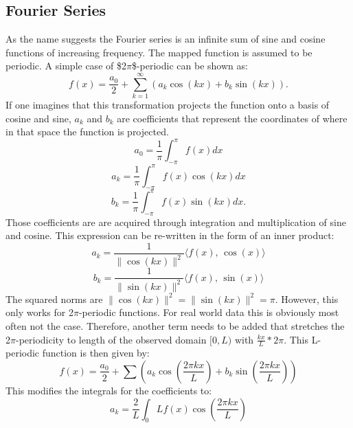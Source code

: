 \documentclass[phd,black, hidelinks]{PrincetonThesis}
\begin{document}
\subsection{Fourier Series}
\label{sec:org4fe6529}
As the name suggests the Fourier series is an infinite sum of sine and cosine functions of increasing frequency. The mapped function is assumed to be periodic. A simple case of \$2\(\pi\)\$-periodic can be shown as:
\begin{equation}
f(x) = \frac{a_0}{2} + \sum_{k=1}^\infty (a_k \cos(kx) + b_k\sin(kx)).
\end{equation}
If one imagines that this transformation projects the function onto a basis of cosine and sine, \(a_k\) and \(b_k\) are coefficients that represent the coordinates of where in that space the function is projected.
\begin{equation}
a_0 = \frac{1}{\pi} \int_{-\pi}^{\pi} f(x)dx
\end{equation}
\begin{equation}
a_k=\frac{1}{\pi} \int_{-\pi}^{\pi} f(x) \cos(kx)dx
\end{equation}
\begin{equation}
b_k=\frac{1}{\pi} \int_{-\pi}^{\pi} f(x) \sin(kx)dx.
\end{equation}
Those coefficients are are acquired through integration and multiplication of sine and cosine.
This expression can be re-written in the form of an inner product:
\begin{equation}
a_k = \frac{1}{\|\cos(kx)\|^2} \langle f(x),\, \cos(x)\rangle
\end{equation}
\begin{equation}
b_k = \frac{1}{\|\sin(kx)\|^2} \langle f(x),\, \sin(x)\rangle
\end{equation}
The squared norms are \(\|\cos(kx)\|^2 = \|\sin(kx)\|^2 = \pi\). However, this only works for 2\(\pi\)-periodic functions. For real world data this is obviously most often not the case. Therefore, another term needs to be added that stretches the 2\(\pi\)-periodicity to length of the observed domain \([0,L)\) with \(\frac{kx}{L}*2\pi\). This L-periodic function is then given by:
\begin{equation}
f(x) = \frac{a_0}{2} + \sum \left( a_k\cos \left( \frac{2\pi kx}{L} \right) + b_k \sin \left( \frac{2\pi kx}{L}  \right)  \right)
\end{equation}
This modifies the integrals for the coefficients to:
\begin{equation}
a_k = \frac{2}{L} \int_{0}{L} f(x) \cos \left( \frac{2\pi kx}{L}  \right)
\end{equation}
\end{document}
